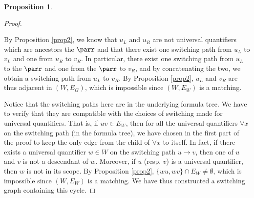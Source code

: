 \documentclass{article}
\theoremstyle{definition}
\newtheorem{proposition}[thm]{Proposition}
\begin{document}
\begin{proposition}
\begin{proof}
\begin{itemize}
    By Proposition \ref{prop2}, we know that $u_L$ and $u_R$ are not
	universal quantifiers which are ancestors the $\parr$
	and that there exist one switching path from $u_L$ to $v_L$ and one
	from $u_R$ to $v_R$. In particular, there exist one switching path from
	$u_L$ to the $\parr$ and one from the $\parr$ to $v_R$, and by
	concatenating the two, we obtain a switching path from $u_L$ to $v_R$. 
	By Proposition \ref{prop2}, $u_L$ and $v_R$ are thus adjacent in $(W,
	E_G)$, which is impossible since $(W, E_W)$ is a matching.
  \end{itemize}
  Notice that the switching paths here are in the underlying formula tree. We
  have to verify that they are compatible with the choices of switching made for
  universal quantifiers. That is, if $uv \in E_W$, then for all the
  universal quantifiers $\forall x$ on the switching path (in the formula
	tree), we have chosen in the first part of the proof to keep the only
	edge from the child of $\forall x$ to itself. In fact, if there exists
	a universal quantifier $w \in W$ on the switching path $u \rightarrow
	v$, then one of $u$ and $v$ is not a descendant of $w$. Moreover, if
	$u$ (resp. $v$) is a universal quantifier, then $w$ is not in its scope.
	By Proposition \ref{prop2}, $\{wu, wv\} \cap E_W \neq \emptyset$, which
	is impossible since $(W, E_W)$ is a matching.
  We have thus constructed a switching graph containing this cycle.
\end{proof}
\end{proposition}
\end{document}
